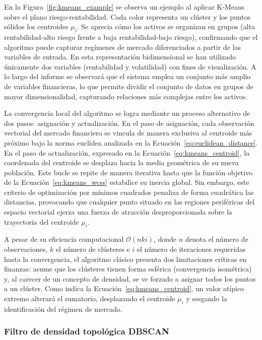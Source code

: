 \documentclass[
]{article}
\begin{document}
	En la Figura~\ref{fig:kmeans_example} se observa un ejemplo al aplicar K-Means sobre el plano riesgo-rentabilidad. Cada color representa un clúster y los puntos sólidos los centroides $\mu_i$. Se aprecia cómo los activos se organizan en grupos (alta rentabilidad-alto riesgo frente a baja rentabilidad-bajo riesgo), confirmando que el algoritmo puede capturar regímenes de mercado diferenciados a partir de las variables de entrada. En esta representación bidimensional se han utilizado únicamente dos variables (rentabilidad y volatilidad) con fines de visualización. A lo largo del informe se observará que el sistema emplea un conjunto más amplio de variables financieras, lo que permite dividir el conjunto de datos en grupos de mayor dimensionalidad, capturando relaciones más complejas entre los activos.

	La convergencia local del algoritmo se logra mediante un proceso alternativo de dos pasos: asignación y actualización. En el paso de asignación, cada observación vectorial del mercado financiero se vincula de manera exclusiva al centroide más próximo bajo la norma euclídea analizada en la Ecuación~\eqref{eq:euclidean_distance}. En el paso de actualización, expresado en la Ecuación~\eqref{eq:kmeans_centroid}, la coordenada del centroide se desplaza hacia la media geométrica de su nueva población. Este bucle se repite de manera iterativa hasta que la función objetivo de la Ecuación~\eqref{eq:kmeans_wcss} estabilice su inercia global. Sin embargo, este criterio de optimización por mínimos cuadrados penaliza de forma cuadrática las distancias, provocando que cualquier punto situado en las regiones periféricas del espacio vectorial ejerza una fuerza de atracción desproporcionada sobre la trayectoria del centroide $\mu_i$.
	
	A pesar de su eficiencia computacional \(\mathcal{O}(nki)\), donde \(n\) 
	denota el número de observaciones, \(k\) el número de clústeres e \(i\) 
	el número de iteraciones requeridas hasta la convergencia, el
	algoritmo clásico presenta dos limitaciones críticas en finanzas: asume
	que los clústeres tienen forma esférica (convergencia isométrica) y, al
	carecer de un concepto de densidad, se ve forzado a asignar todos los
	puntos a un clúster. Como indica la Ecuación~\eqref{eq:kmeans_centroid}, un valor atípico extremo alterará el sumatorio, desplazando el
	centroide \(\mu_{i}\) y sesgando la identificación del régimen de
	mercado.
	
	\subsubsection{Filtro de densidad topológica
		DBSCAN}\label{filtro-de-densidad-topoluxf3gica-dbscan}
	
\end{document}
